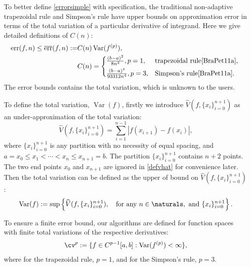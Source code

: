 \documentclass{iitthesis}
\DeclareMathOperator{\Var}{Var}
\theoremstyle{definition}
\theoremstyle{remark}
\begin{document}
To better define \eqref{errorsimple} with specification, the traditional non-adaptive trapezoidal rule and Simpson's rule have upper bounds on approximation error in terms of the total variation of a particular derivative of integrand. Here we give detailed definitions of $C(n)$:
\begin{align}\label{errorbound}
    \text{err}(f,n)\le\overline{\text{err}}(f,n):=&C(n)\Var(f^{(p)}),\\
    \nonumber&C(n)=
    \begin{cases*}
           \frac{(b-a)^2}{8n^2}, p=1,  & \mbox{trapezoidal rule}\cite[(7.15)]{BraPet11a}, \\
           \frac{(b-a)^4}{93312n^4}, p=3, & \mbox{Simpson's rule}\cite[(p.231)]{BraPet11a}.
    \end{cases*}
\end{align}
The error bounds contains the total variation, which is unknown to the users.

To define the total variation, $\Var(f)$, firstly we introduce $\widehat{V}(f,\{x_i\}_{i=0}^{n+1})$ as an under-approximation of the total variation:
\begin{equation}\label{defvhat}
    \widehat{V}(f,\{x_i\}_{i=0}^{n+1})=\sum_{i=1}^{n-1}|f(x_{i+1})-f(x_{i})|,
\end{equation}
where $\{x_i\}_{i=0}^{n+1}$ is any partition with no necessity of equal spacing, and $a=x_{0}\leq x_{1}<\cdots<x_{n}\leq x_{n+1}=b$.
The partition $\{x_i\}_{i=0}^{n+1}$ contains $n+2$ points. The two end points $x_0$ and $x_{n+1}$ are ignored in \eqref{defvhat} for convenience later.
Then the total variation can be defined as the upper of bound on $\widehat{V}(f,\{x_i\}_{i=0}^{n+1})$:
\begin{equation}\label{defvar}
  \Var(f) := \sup \left\{\widehat{V}(f,\{x_i\}_{i=0}^{n+1}), \quad \text{for any }n \in \naturals, \text{ and } \{x_i\}_{i=0}^{n+1}\right\}.
\end{equation}

To ensure a finite error bound, our algorithms are defined for function spaces with finite total variations of the respective derivatives:
\begin{equation}\label{defspace}
 \cv^{p}:=\{f\in C^{p-1}[a,b]: \Var(f^{(p)}) < \infty \},
\end{equation}
where for the trapezoidal rule, $p=1$, and for the Simpson's rule, $p=3$.
\end{document}
